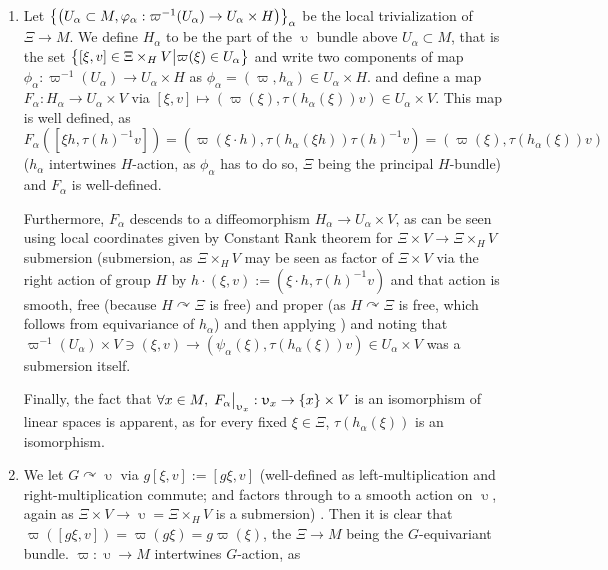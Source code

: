\documentclass[8pt]{article} %
\begin{document}
\begin{enumerate}
	\item Let $\left\{ \left( U_\alpha\subset M,\varphi_\alpha:\varpi^{ -1 }(U_\alpha)\to U_\alpha\times H \right) \right\}_\alpha$
		be the local trivialization of $\Xi\to M$.
			We define $H_\alpha$ to be the part of the $\upupsilon$ bundle
			above $U_\alpha\subset M$, that is the set $\left\{ [\xi,v]\in\Xi\times_HV \big|  \varpi(\xi)\in U_\alpha \right\}$
			and write two components of map $\phi_\alpha:\varpi^{ -1 }(U_\alpha)\to U_\alpha\times H$ as 
			$\phi_\alpha=(\varpi,h_\alpha)\in U_\alpha\times H$.
			and define a map $F_\alpha:H_\alpha\to U_\alpha\times V$ via $[\xi,v]\mapsto(\varpi(\xi),\tau(h_\alpha
			(\xi))v)\in U_\alpha\times V$. This map is well defined, as 
			$F_\alpha([\xi h,\tau(h)^{ -1 }v])=(\varpi(\xi\cdot h),\tau(h_\alpha(\xi h))\tau(h)^{ -1 }v)=
			(\varpi(\xi),\tau(h_\alpha(\xi))v)$ ($h_\alpha$ intertwines $H$-action, as $\phi_\alpha$ has to do so,
			$\Xi$ being the principal $H$-bundle) and $F_\alpha$ is well-defined.\par
			Furthermore, $F_\alpha$ descends to a diffeomorphism $H_\alpha\to U_\alpha\times V$, as 
			can be seen using local
			coordinates given by Constant Rank theorem for $\Xi\times V\to \Xi\times_HV$ submersion
			(submersion, as $\Xi\times_HV$ may be seen as factor of $\Xi\times V$ via the right action of group $H$
			by $h\cdot(\xi,v):=(\xi\cdot h,\tau(h)^{ -1 }v)$ and that action is smooth, free 
			(because $H\curvearrowright\Xi$ is free) 
			and proper 
			(as $H\curvearrowright\Xi$ is free, which follows from equivariance of $h_\alpha$)
			and then applying \cite[Theorem 9.16]{lee}) and noting that
			$\varpi^{ -1 }(U_\alpha)\times V\ni(\xi,v)\to(\psi_\alpha(\xi),\tau(h_\alpha
			(\xi))v)\in U_\alpha\times V$ was a submersion itself.\par
			Finally, the fact that $\forall x\in M,\;F_\alpha\big|_{ \upupsilon_x }:\upupsilon_x\to\left\{ x \right\}\times V$
			is an isomorphism of linear spaces is apparent, as for every fixed $\xi\in\Xi$, $\tau(h_\alpha(\xi))$
			is an isomorphism.
		\item We let $G\curvearrowright\upupsilon$ via $g[\xi,v]:=[g\xi,v]$ (well-defined as left-multiplication
			and right-multiplication commute; and factors through to a smooth action on $\upupsilon$, again as
			$\Xi\times V\to\upupsilon=\Xi\times_HV$ is a submersion)
			. Then it is clear that $\varpi([g\xi,v])=\varpi(g\xi)=g\varpi(\xi)$, the $\Xi\to M$ being the 
			$G$-equivariant bundle.
		$\varpi:\upupsilon\to M$ intertwines $G$-action, as 
\end{enumerate}
\end{document}
